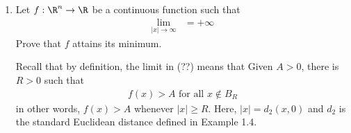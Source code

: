 \documentclass[10pt,a4paper]{report}
\begin{document}
\begin{enumerate}[label=\Roman*.]
	\item Let $f:\R^n \to \R$ be a continuous function such that 
	\begin{align*}
		\lim_{|x| \to \infty} &= + \infty
	\end{align*}Prove that $f$ attains its minimum.
	
	Recall that by definition, the limit in (??) means that Given $A > 0$, there is $R>0$ such that 
	\begin{align*}
		f(x) >A \text{    for all } x \not\in B_R
	\end{align*}in other words, $f(x) >A$ whenever $|x| \ge R$. Here, $|x| = d_2(x,0)$ and $d_2$ is the standard Euclidean distance defined in Example 1.4.
\end{enumerate}
\end{document}
